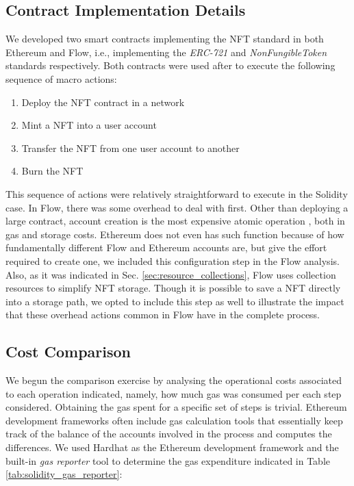 \documentclass[../NFTComp_IEEE.tex]{subfiles}
\begin{document}
\subsection{Contract Implementation Details}
We developed two smart contracts implementing the NFT standard in both Ethereum and Flow, i.e., implementing the \textit{ERC-721} and \textit{NonFungibleToken} standards respectively. Both contracts were used after to execute the following sequence of macro actions:
\begin{enumerate}
    \item {Deploy the NFT contract in a network}
    \item {Mint a NFT into a user account}
    \item {Transfer the NFT from one user account to another}
    \item {Burn the NFT}
\end{enumerate}

This sequence of actions were relatively straightforward to execute in the Solidity case. In Flow, there was some overhead to deal with first. Other than deploying a large contract, account creation is the most expensive atomic operation \cite{flow2024d}, both in gas and storage costs. Ethereum does not even has such function because of how fundamentally different Flow and Ethereum accounts are, but give the effort required to create one, we included this configuration step in the Flow analysis. Also, as it was indicated in Sec. \ref{sec:resource_collections}, Flow uses collection resources to simplify NFT storage. Though it is possible to save a NFT directly into a storage path, we opted to include this step as well to illustrate the impact that these overhead actions common in Flow have in the complete process.

\subsection{Cost Comparison}
We begun the comparison exercise by analysing the operational costs associated to each operation indicated, namely, how much gas was consumed per each step considered. Obtaining the gas spent for a specific set of steps is trivial. Ethereum development frameworks often include gas calculation tools that essentially keep track of the balance of the accounts involved in the process and computes the differences. We used Hardhat as the Ethereum development framework and the built-in \textit{gas reporter} tool to determine the gas expenditure indicated in Table \ref{tab:solidity_gas_reporter}:
\end{document}
